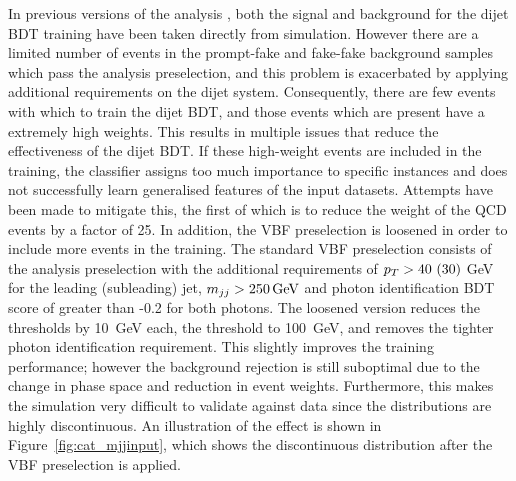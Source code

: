 In previous versions of the analysis \cite{HIG-16-040}, 
both the signal and background for the dijet BDT training have been taken directly from simulation. 
However there are a limited number of events in the prompt-fake and fake-fake background samples 
which pass the analysis preselection, 
and this problem is exacerbated by applying additional requirements on the dijet system.
Consequently, there are few events with which to train the dijet BDT, 
and those events which are present have a extremely high weights.
This results in multiple issues that reduce the effectiveness of the dijet BDT.
If these high-weight events are included in the training, 
the classifier assigns too much importance to specific instances 
and does not successfully learn generalised features of the input datasets.
Attempts have been made to mitigate this, 
the first of which is to reduce the weight of the QCD events by a factor of 25.
In addition, the VBF preselection is loosened in 
order to include more events in the training.
The standard VBF preselection consists of the analysis preselection 
with the additional requirements of $p_T > 40~(30)$ GeV for the leading (subleading) jet, 
$m_{jj} > \SI{250}{GeV}$ and photon identification BDT score of greater than -0.2 for both photons.
The loosened version reduces the \pt thresholds by \SI{10}{GeV} each, 
the \mjj threshold to \SI{100}{GeV}, and removes the tighter photon identification requirement.
This slightly improves the training performance; 
however the background rejection is still suboptimal 
due to the change in phase space and reduction in event weights.
Furthermore, this makes the simulation very difficult to validate against data
since the distributions are highly discontinuous.
An illustration of the effect is shown in Figure~\ref{fig:cat_mjjinput}, 
which shows the discontinuous \mjj distribution after the VBF preselection is applied.

